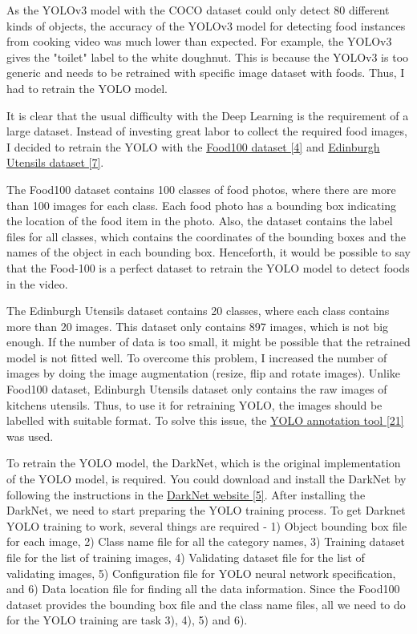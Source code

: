 \documentclass{article}
\begin{document}
As the YOLOv3 model with the COCO dataset could only detect 80 different kinds of objects, the accuracy of the YOLOv3 model for detecting food instances from cooking video was much lower than expected. For example, the YOLOv3 gives the "toilet" label to the white doughnut. This is because the YOLOv3 is too generic and needs to be retrained with specific image dataset with foods. Thus, I had to retrain the YOLO model.

It is clear that the usual difficulty with the Deep Learning is the requirement of a large dataset. Instead of investing great labor to collect the required food images, I decided to retrain the YOLO with the \hyperlink{ref4}{Food100 dataset [4]} and \hyperlink{ref7}{Edinburgh Utensils dataset [7]}.

The Food100 dataset contains 100 classes of food photos, where there are more than 100 images for each class. Each food photo has a bounding box indicating the location of the food item in the photo. Also, the dataset contains the label files for all classes, which contains the coordinates of the bounding boxes and the names of the object in each bounding box. Henceforth, it would be possible to say that the Food-100 is a perfect dataset to retrain the YOLO model to detect foods in the video.

The Edinburgh Utensils dataset contains 20 classes, where each class contains more than 20 images. This dataset only contains 897 images, which is not big enough. If the number of data is too small, it might be possible that the retrained model is not fitted well. To overcome this problem, I increased the number of images by doing the image augmentation (resize, flip and rotate images). Unlike Food100 dataset, Edinburgh Utensils dataset only contains the raw images of kitchens utensils. Thus, to use it for retraining YOLO, the images should be labelled with suitable format. To solve this issue, the \hyperlink{ref21}{YOLO annotation tool [21]} was used.

To retrain the YOLO model, the DarkNet, which is the original implementation of the YOLO model, is required. You could download and install the DarkNet by following the instructions in the \hyperlink{ref5}{DarkNet website [5]}. After installing the DarkNet, we need to start preparing the YOLO training process. To get Darknet YOLO training to work, several things are required - 1) Object bounding box file for each image, 2) Class name file for all the category names, 3) Training dataset file for the list of training images, 4) Validating dataset file for the list of validating images, 5) Configuration file for YOLO neural network specification, and 6) Data location file for finding all the data information. Since the Food100 dataset provides the bounding box file and the class name files, all we need to do for the YOLO training are task 3), 4), 5) and 6).
\end{document}
